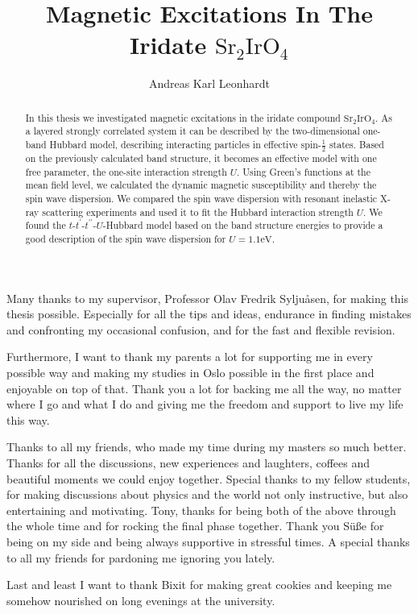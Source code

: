 \documentclass[a4paper,12pt]{uiofysmaster}
\title{Magnetic Excitations In The Iridate $\mathrm{Sr}_2\mathrm{IrO}_4$}
\author{Andreas Karl Leonhardt}
\newcommand{\Sriro}{$\mathrm{Sr}_2\mathrm{Ir}\mathrm{O}_4$\:}
\begin{document}

\cleardoublepage

\begin{abstract}
In this thesis we investigated magnetic excitations in the iridate compound \Sriro.
As a layered strongly correlated system it can be described by the two-dimensional one-band Hubbard model, 
describing interacting particles in effective spin-$\frac12$ states.
Based on the previously calculated band structure, it becomes an effective model with one free parameter, the one-site interaction strength $U$.
Using Green's functions at the mean field level, we calculated the dynamic magnetic susceptibility
and thereby the spin wave dispersion.
We compared the spin wave dispersion with resonant inelastic X-ray scattering experiments and used it to fit the Hubbard interaction strength $U$. 
We found the $t$-$t^{\prime}$-$t^{\prime\prime}$-$U$-Hubbard model based on the band structure energies
to provide a good description of the spin wave dispersion for $U=1.1\mathrm{eV}$. 
\end{abstract}


\begin{acknowledgements}
 Many thanks to my supervisor, Professor Olav Fredrik Syljuåsen, for making this thesis possible.
 Especially for all the tips and ideas, endurance in finding mistakes and confronting my occasional confusion, and for the fast and flexible revision.

 Furthermore, I want to thank my parents a lot for supporting me in every possible way and making my studies in Oslo possible in the first place and enjoyable on top of that.
 Thank you a lot for backing me all the way, no matter where I go and what I do and giving me the freedom and support to live my life this way. 
 
 Thanks to all my friends, who made my time during my masters so much better. 
 Thanks for all the discussions, new experiences and laughters, coffees and beautiful moments we could enjoy together.
 Special thanks to my fellow students, for making discussions about physics and the world  not only instructive, but also entertaining and motivating.
 Tony, thanks for being both of the above through the whole time and for rocking the final phase together. 
 Thank you Süße for being on my side and being always supportive in stressful times. 
 A special thanks to all my friends for pardoning me ignoring you lately.
 
 Last and least I want to thank Bixit for making great cookies and keeping me somehow nourished on long evenings at the university. 
 
\end{acknowledgements}
\end{document}
